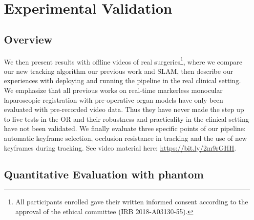 \section{Experimental Validation}
\label{sec:experiments}
\subsection{Overview}
We then present results with offline videos of real surgeries\footnote{All participants enrolled gave their written informed consent according to the approval of the ethical committee (IRB 2018-A03130-55).}, where we compare our new tracking algorithm \wrt our previous work and SLAM, then describe our experiences with deploying and running the pipeline in the real clinical setting.
We emphasize that all previous works on real-time markerless monocular laparoscopic registration with pre-operative organ models have only been evaluated with pre-recorded video data.
Thus they have never made the step up to live tests in the OR and their robustness and practicality in the clinical setting have not been validated.
We finally evaluate three specific points of our pipeline: automatic keyframe selection, occlusion resistance in tracking and the use of new keyframes during tracking.
See video material here: \url{https://bit.ly/2m9rGHH}.

\subsection{Quantitative Evaluation with phantom}
\label{subsec:quantitative-evaluation-with-phantom}

